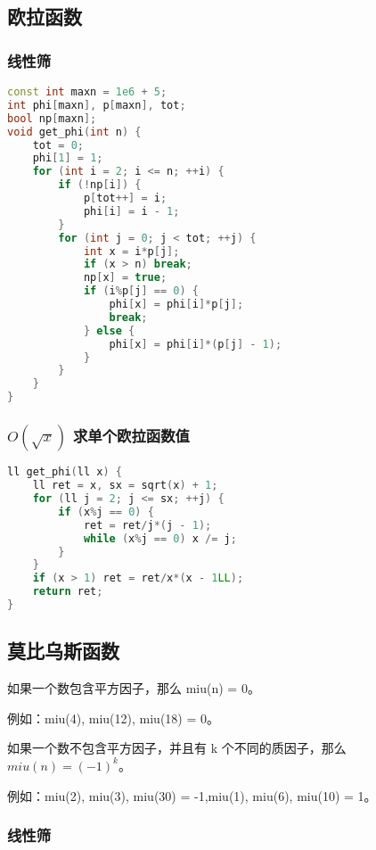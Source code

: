 \subsection{欧拉函数}

\subsubsection{线性筛}

\begin{lstlisting}[language=C++]
const int maxn = 1e6 + 5;
int phi[maxn], p[maxn], tot;
bool np[maxn];
void get_phi(int n) {
    tot = 0;
    phi[1] = 1;
    for (int i = 2; i <= n; ++i) {
        if (!np[i]) {
            p[tot++] = i;
            phi[i] = i - 1;
        }
        for (int j = 0; j < tot; ++j) {
            int x = i*p[j];
            if (x > n) break;
            np[x] = true;
            if (i%p[j] == 0) {
                phi[x] = phi[i]*p[j];
                break;
            } else {
                phi[x] = phi[i]*(p[j] - 1);
            }
        }
    }
}
\end{lstlisting}

\subsubsection{$O(\sqrt{x})$ 求单个欧拉函数值}

\begin{lstlisting}[language=C++]
ll get_phi(ll x) {
    ll ret = x, sx = sqrt(x) + 1;
    for (ll j = 2; j <= sx; ++j) {
        if (x%j == 0) {
            ret = ret/j*(j - 1);
            while (x%j == 0) x /= j;
        }
    }
    if (x > 1) ret = ret/x*(x - 1LL);
    return ret;
}
\end{lstlisting}

\subsection{莫比乌斯函数}


如果一个数包含平方因子，那么 miu(n) = 0。

例如：miu(4), miu(12), miu(18) = 0。

如果一个数不包含平方因子，并且有 k 个不同的质因子，那么 $miu(n) = (-1)^k$。

例如：miu(2), miu(3), miu(30) = -1,miu(1), miu(6), miu(10) = 1。

\subsubsection{线性筛}

